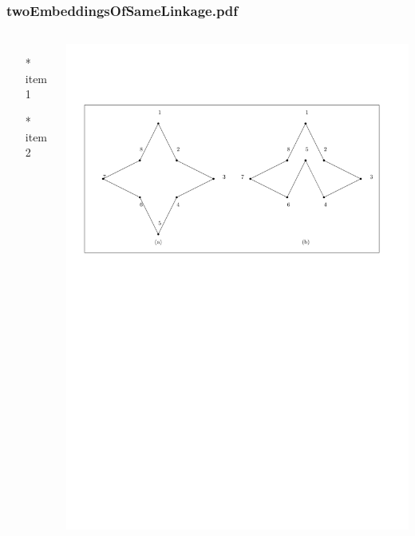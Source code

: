 \begin{frame} \frametitle{twoEmbeddingsOfSameLinkage.pdf}
    \begin{columns}[c]
        \begin{itemize}
            \item[*] item 1
            \item[*] item 2
        \end{itemize}
        \begin{minipage}{\linewidth}
            \begin{center}
            \includegraphics[width=.9\textwidth]{graphics/twoEmbeddingsOfSameLinkage.pdf}
            \label{gfx:twoEmbeddingsOfSameLinkage.pdf}
            \end{center}
        \end{minipage}
    \end{columns}
\end{frame}
